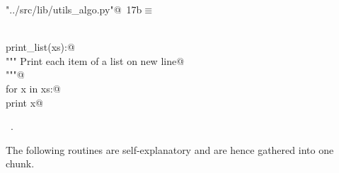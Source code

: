 \documentclass[11.5pt]{report}
\begin{document}
\begin{flushleft} \small\label{scrap9}\raggedright\small
{} \verb@"../src/lib/utils_algo.py"@\nobreak\ {\footnotesize {17b}}$\equiv$
\vspace{-1ex}
\begin{list}{}{} \item
\mbox{}\verb@@\\
\mbox{}\verb@def print_list(xs):@\\
\mbox{}\verb@    """ Print each item of a list on new line@\\
\mbox{}\verb@    """@\\
\mbox{}\verb@    for x in xs:@\\
\mbox{}\verb@        print x@\\
\mbox{}\verb@@{\NWsep}
\end{list}
\vspace{-1.5ex}
\footnotesize
\begin{list}{}{\setlength{\itemsep}{-\parsep}\setlength{\itemindent}{-\leftmargin}}
\item \NWtxtFileDefBy\ .

\item{}
\end{list}
\vspace{4ex}
\end{flushleft}
\newchunk The following routines are self-explanatory and are hence gathered into one chunk. 
\end{document}
